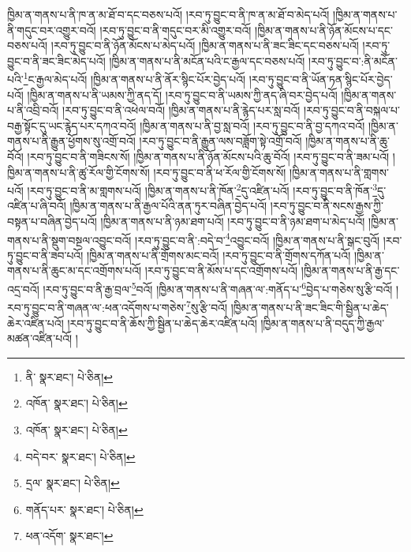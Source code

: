 ཁྱིམ་ན་གནས་པ་ནི་ཁ་ན་མ་ཐོ་བ་དང་བཅས་པའོ། །རབ་ཏུ་བྱུང་བ་ནི་ཁ་ན་མ་ཐོ་བ་མེད་པའོ། །ཁྱིམ་ན་གནས་པ་ནི་གདུང་བར་འགྱུར་བའོ། །རབ་ཏུ་བྱུང་བ་ནི་གདུང་བར་མི་འགྱུར་བའོ། །ཁྱིམ་ན་གནས་པ་ནི་ཉོན་མོངས་པ་དང་བཅས་པའོ། །རབ་ཏུ་བྱུང་བ་ནི་ཉོན་མོངས་པ་མེད་པའོ། །ཁྱིམ་ན་གནས་པ་ནི་ཟང་ཟིང་དང་བཅས་པའོ། །རབ་ཏུ་བྱུང་བ་ནི་ཟང་ཟིང་མེད་པའོ། །ཁྱིམ་ན་གནས་པ་ནི་མངོན་པའི་ང་རྒྱལ་དང་བཅས་པའོ། །རབ་ཏུ་བྱུང་བ་:ནི་མངོན་པའི་\footnote{ནི་  སྣར་ཐང་།  པེ་ཅིན། }ང་རྒྱལ་མེད་པའོ། །ཁྱིམ་ན་གནས་པ་ནི་ནོར་སྙིང་པོར་བྱེད་པའོ། །རབ་ཏུ་བྱུང་བ་ནི་ཡོན་ཏན་སྙིང་པོར་བྱེད་པའོ། །ཁྱིམ་ན་གནས་པ་ནི་ཡམས་ཀྱི་ནད་དོ། །རབ་ཏུ་བྱུང་བ་ནི་ཡམས་ཀྱི་ནད་ཞི་བར་བྱེད་པའོ། །ཁྱིམ་ན་གནས་པ་ནི་འབྲི་བའོ། །རབ་ཏུ་བྱུང་བ་ནི་འཕེལ་བའོ། །ཁྱིམ་ན་གནས་པ་ནི་རྙེད་པར་སླ་བའོ། །རབ་ཏུ་བྱུང་བ་ནི་བསྐལ་པ་བརྒྱ་སྟོང་དུ་ཡང་རྙེད་པར་དཀའ་བའོ། །ཁྱིམ་ན་གནས་པ་ནི་བྱ་སླ་བའོ། །རབ་ཏུ་བྱུང་བ་ནི་བྱ་དཀའ་བའོ། །ཁྱིམ་ན་གནས་པ་ནི་རྒྱུན་ཕྱོགས་སུ་འགྲོ་བའོ། །རབ་ཏུ་བྱུང་བ་ནི་རྒྱུན་ལས་བཟློག་སྟེ་འགྲོ་བའོ། །ཁྱིམ་ན་གནས་པ་ནི་ཆུ་བོའོ། །རབ་ཏུ་བྱུང་བ་ནི་གཟིངས་སོ། །ཁྱིམ་ན་གནས་པ་ནི་ཉོན་མོངས་པའི་ཆུ་བོའོ། །རབ་ཏུ་བྱུང་བ་ནི་ཟམ་པའོ། །ཁྱིམ་ན་གནས་པ་ནི་ཚུ་རོལ་གྱི་ངོགས་སོ། །རབ་ཏུ་བྱུང་བ་ནི་ཕ་རོལ་གྱི་ངོགས་སོ། །ཁྱིམ་ན་གནས་པ་ནི་གླགས་པའོ། །རབ་ཏུ་བྱུང་བ་ནི་མ་གླགས་པའོ། །ཁྱིམ་ན་གནས་པ་ནི་ཁོན་\footnote{འཁོན་  སྣར་ཐང་།  པེ་ཅིན། }དུ་འཛིན་པའོ། །རབ་ཏུ་བྱུང་བ་ནི་ཁོན་\footnote{འཁོན་  སྣར་ཐང་།  པེ་ཅིན། }དུ་འཛིན་པ་ཞི་བའོ། །ཁྱིམ་ན་གནས་པ་ནི་རྒྱལ་པོའི་ནན་ཏུར་བཞིན་བྱེད་པའོ། །རབ་ཏུ་བྱུང་བ་ནི་སངས་རྒྱས་ཀྱི་བསྟན་པ་བཞིན་བྱེད་པའོ། །ཁྱིམ་ན་གནས་པ་ནི་ཉམ་ཐག་པའོ། །རབ་ཏུ་བྱུང་བ་ནི་ཉམ་ཐག་པ་མེད་པའོ། །ཁྱིམ་ན་གནས་པ་ནི་སྡུག་བསྔལ་འབྱུང་བའོ། །རབ་ཏུ་བྱུང་བ་ནི་:བདེ་བ་\footnote{བདེ་བར་  སྣར་ཐང་།  པེ་ཅིན། }འབྱུང་བའོ། །ཁྱིམ་ན་གནས་པ་ནི་སྒང་བུའོ། །རབ་ཏུ་བྱུང་བ་ནི་ཟབ་པའོ། །ཁྱིམ་ན་གནས་པ་ནི་གྲོགས་མང་བའོ། །རབ་ཏུ་བྱུང་བ་ནི་གྲོགས་དཀོན་པའོ། །ཁྱིམ་ན་གནས་པ་ནི་ཆུང་མ་དང་འགྲོགས་པའོ། །རབ་ཏུ་བྱུང་བ་ནི་མོས་པ་དང་འགྲོགས་པའོ། །ཁྱིམ་ན་གནས་པ་ནི་རྒྱ་དང་འདྲ་བའོ། །རབ་ཏུ་བྱུང་བ་ནི་རྒྱ་བྲལ་\footnote{དྲལ་  སྣར་ཐང་།  པེ་ཅིན། }བའོ། །ཁྱིམ་ན་གནས་པ་ནི་གཞན་ལ་:གནོད་པ་\footnote{གནོད་པར་  སྣར་ཐང་།  པེ་ཅིན། }བྱེད་པ་གཅེས་སུ་རྩི་བའོ། །རབ་ཏུ་བྱུང་བ་ནི་གཞན་ལ་:ཕན་འདོགས་པ་གཅེས་\footnote{ཕན་འདོག་  སྣར་ཐང་། }སུ་རྩི་བའོ། །ཁྱིམ་ན་གནས་པ་ནི་ཟང་ཟིང་གི་སྦྱིན་པ་ཆེད་ཆེར་འཛིན་པའོ། །རབ་ཏུ་བྱུང་བ་ནི་ཆོས་ཀྱི་སྦྱིན་པ་ཆེད་ཆེར་འཛིན་པའོ། །ཁྱིམ་ན་གནས་པ་ནི་བདུད་ཀྱི་རྒྱལ་མཚན་འཛིན་པའོ། །

